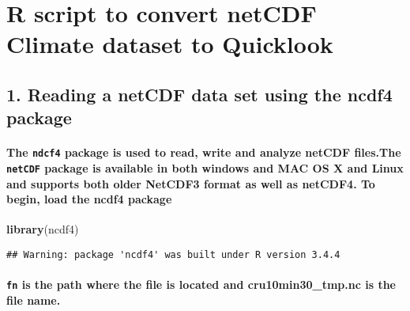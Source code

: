 \documentclass[]{article}
\title{}
\author{}
\date{}
\newenvironment{Shaded}{\begin{snugshade}}{\end{snugshade}}
\newcommand{\KeywordTok}[1]{\textcolor[rgb]{0.13,0.29,0.53}{\textbf{#1}}}
\newcommand{\NormalTok}[1]{#1}
\let\oldparagraph\paragraph
\renewcommand{\paragraph}[1]{\oldparagraph{#1}\mbox{}}
\begin{document}
\section{R script to convert netCDF Climate dataset to
Quicklook}\label{r-script-to-convert-netcdf-climate-dataset-to-quicklook}

\subsection{1. Reading a netCDF data set using the ncdf4
package}\label{reading-a-netcdf-data-set-using-the-ncdf4-package}

\paragraph{\texorpdfstring{The \texttt{ndcf4} package is used to read,
write and analyze netCDF files.The \texttt{netCDF} package is available
in both windows and MAC OS X and Linux and supports both older NetCDF3
format as well as netCDF4. To begin, load the ncdf4
package}{The ndcf4 package is used to read, write and analyze netCDF files.The netCDF package is available in both windows and MAC OS X and Linux and supports both older NetCDF3 format as well as netCDF4. To begin, load the ncdf4 package}}\label{the-ndcf4-package-is-used-to-read-write-and-analyze-netcdf-files.the-netcdf-package-is-available-in-both-windows-and-mac-os-x-and-linux-and-supports-both-older-netcdf3-format-as-well-as-netcdf4.-to-begin-load-the-ncdf4-package}

\begin{Shaded}
\begin{Highlighting}[]
\KeywordTok{library}\NormalTok{(ncdf4)}
\end{Highlighting}
\end{Shaded}

\begin{verbatim}
## Warning: package 'ncdf4' was built under R version 3.4.4
\end{verbatim}

\paragraph{\texorpdfstring{\texttt{fn} is the path where the file is
located and cru10min30\_tmp.nc is the file
name.}{fn is the path where the file is located and cru10min30\_tmp.nc is the file name.}}\label{fn-is-the-path-where-the-file-is-located-and-cru10min30_tmp.nc-is-the-file-name.}
\end{document}
